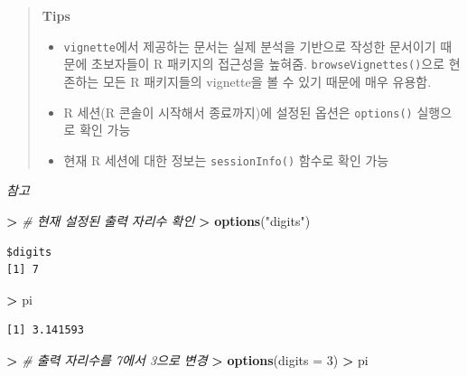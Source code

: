 \documentclass[11pt,a4paper]{book}
\newenvironment{Shaded}{\begin{snugshade}}{\end{snugshade}}
\newcommand{\KeywordTok}[1]{\textcolor[rgb]{0.13,0.29,0.53}{\textbf{#1}}}
\newcommand{\DataTypeTok}[1]{\textcolor[rgb]{0.13,0.29,0.53}{#1}}
\newcommand{\DecValTok}[1]{\textcolor[rgb]{0.00,0.00,0.81}{#1}}
\newcommand{\StringTok}[1]{\textcolor[rgb]{0.31,0.60,0.02}{#1}}
\newcommand{\CommentTok}[1]{\textcolor[rgb]{0.56,0.35,0.01}{\textit{#1}}}
\newcommand{\OperatorTok}[1]{\textcolor[rgb]{0.81,0.36,0.00}{\textbf{#1}}}
\newcommand{\ErrorTok}[1]{\textcolor[rgb]{0.64,0.00,0.00}{\textbf{#1}}}
\newcommand{\NormalTok}[1]{#1}
\theoremstyle{definition}
\theoremstyle{definition}
\theoremstyle{definition}
\theoremstyle{remark}
\begin{document}
\begin{quote}
\colorbox{gray!10}{\begin{minipage}{15cm}
\textbf{Tips}
\begin{itemize}
\item \texttt{vignette}에서 제공하는 문서는 실제 분석을 기반으로 작성한 문서이기 때문에 초보자들이 R 패키지의 접근성을 높혀줌. \texttt{browseVignettes()}으로 현존하는 모든 R 패키지들의 vignette을 볼 수 있기 때문에 매우 유용함.
\item R 세션(R 콘솔이 시작해서 종료까지)에 설정된 옵션은 \texttt{options()} 실행으로 확인 가능
\item 현재 R 세션에 대한 정보는 \texttt{sessionInfo()} 함수로 확인 가능
\end{itemize}
\end{minipage}}
\end{quote}

\emph{참고}

\footnotesize

\begin{Shaded}
\begin{Highlighting}[]
\OperatorTok{>}\StringTok{ }\CommentTok{# 현재 설정된 출력 자리수 확인}
\ErrorTok{>}\StringTok{ }\KeywordTok{options}\NormalTok{(}\StringTok{"digits"}\NormalTok{)}
\end{Highlighting}
\end{Shaded}

\begin{verbatim}
$digits
[1] 7
\end{verbatim}

\begin{Shaded}
\begin{Highlighting}[]
\OperatorTok{>}\StringTok{ }\NormalTok{pi}
\end{Highlighting}
\end{Shaded}

\begin{verbatim}
[1] 3.141593
\end{verbatim}

\begin{Shaded}
\begin{Highlighting}[]
\OperatorTok{>}\StringTok{ }\CommentTok{# 출력 자리수를 7에서 3으로 변경}
\ErrorTok{>}\StringTok{ }\KeywordTok{options}\NormalTok{(}\DataTypeTok{digits =} \DecValTok{3}\NormalTok{)}
\OperatorTok{>}\StringTok{ }\NormalTok{pi}
\end{Highlighting}
\end{Shaded}
\end{document}
